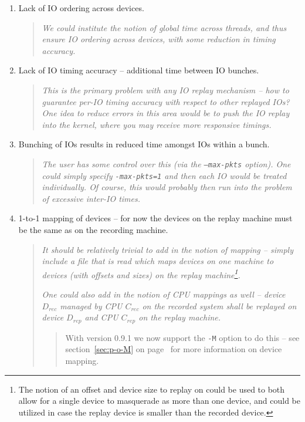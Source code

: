 \documentclass{article}
\begin{document}
\begin{enumerate}
  \item Lack of IO ordering across devices. 

  \begin{quote}
    \emph{We could institute the notion of global time across threads,
    and thus ensure IO ordering across devices, with some reduction in
    timing accuracy.}
  \end{quote}

  \item Lack of IO timing accuracy -- additional time between IO bunches.

  \begin{quote}
    \emph{This is the primary problem with any IO replay mechanism -- how
    to guarantee per-IO timing accuracy with respect to other replayed IOs?
    One idea to reduce errors in this area would be to push the IO replay
    into the kernel, where you \emph{may} receive more responsive timings.}
  \end{quote}

  \item Bunching of IOs results in reduced time amongst IOs within a bunch.

  \begin{quote}
    \emph{The user has \emph{some} control over this (via the
    \texttt{--max-pkts} option). One \emph{could} simply specify
    \texttt{-max-pkts=1} and then each IO would be treated individually. Of
    course, this would probably then run into the problem of excessive
    inter-IO times.}
  \end{quote}

  \item 1-to-1 mapping of devices -- for now the devices on the replay
  machine must be the same as on the recording machine. 

  \begin{quote}
    \emph{It should be relatively trivial to add in the notion of
    mapping -- simply include a file that is read which maps devices
    on one machine to devices (with offsets and sizes) on the replay
    machine\footnote{The notion of an offset and device size to replay on
    could be used to both allow for a single device to masquerade as more
    than one device, and could be utilized in case the replay device is
    smaller than the recorded device.}.}
    
    \medskip\emph{One could also add in the notion of CPU mappings as well --
    device $D_{rec}$ managed by CPU $C_{rec}$ on the recorded system
    shall be replayed on device $D_{rep}$ and CPU $C_{rep}$ on the
    replay machine.}

    \bigskip
    \begin{quote}
      With version 0.9.1 we now support the \texttt{-M} option to do this
      -- see section~\ref{sec:p-o-M} on page~\pageref{sec:p-o-M} for more
      information on device mapping.
    \end{quote}
  \end{quote}

\end{enumerate}
\end{document}
